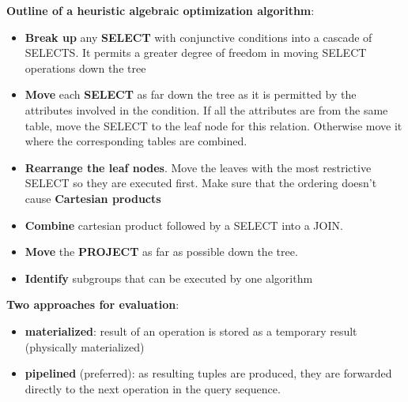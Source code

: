 \textbf{Outline of a heuristic algebraic optimization algorithm}:
\begin{itemize}
    \item \textbf{Break up} any \textbf{SELECT} with conjunctive conditions into a cascade of SELECTS. It permits a greater degree of freedom in moving SELECT operations down the tree
    \item \textbf{Move} each \textbf{SELECT} as far down the tree as it is permitted by the attributes involved in the condition. If all the attributes are from the same table, move the SELECT to the leaf node for this relation. Otherwise move it where the corresponding tables are combined. 
    \item \textbf{Rearrange the leaf nodes}. Move the leaves with the most restrictive SELECT so they are executed first. Make sure that the ordering doesn't cause \textbf{Cartesian products}
    \item \textbf{Combine} cartesian product followed by a SELECT into a JOIN.
    \item \textbf{Move} the \textbf{PROJECT} as far as possible down the tree.
    \item \textbf{Identify} subgroups that can be executed by one algorithm
\end{itemize}

\textbf{Two approaches for evaluation}:

\begin{itemize}
    \item \textbf{materialized}: result of an operation is stored as a temporary result (physically materialized)
    \item \textbf{pipelined} (preferred): as resulting tuples are produced, they are forwarded directly to the next operation in the query sequence. 
\end{itemize}

